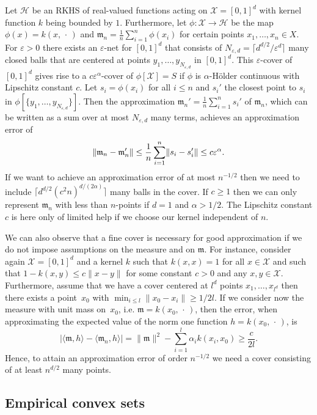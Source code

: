 \documentclass[AHL,Unicode,longabstracts,published]{cedram}
\theoremstyle{remark}
\newcommand{\X}{\mathcal{X}}
\newcommand{\cH}{\mathcal{H}}
\newcommand{\mean}{\mathfrak{m}}
\let\originalleft\left
\let\originalright\right
\renewcommand{\left}{\mathopen{}\mathclose\bgroup\originalleft}
\renewcommand{\right}{\aftergroup\egroup\originalright}
\begin{document}
Let $\cH$ be an RKHS of real-valued functions acting on $\X= [0,1]^d$ with kernel function $k$ being bounded by $1$. Furthermore, let $\phi:\X \rightarrow \cH$ be the map $\phi(x) = k(x,\,\cdot\,)$ and $\mean_n = \frac{1}{n} \sum_{i=1}^n \phi(x_i)$ for certain points $x_1,\dots, x_n \in X$. For $\varepsilon >0$ there exists an $\varepsilon$-net for $[0,1]^d$ that consists of $N_{\varepsilon,d} = \lceil d^{d/2}/\varepsilon^d\rceil$ many closed balls that are centered at points $y_1,\dots, y_{N_{\varepsilon,d}}$ in $[0,1]^d$. This $\varepsilon$-cover of $[0,1]^d$ gives rise to a $c \varepsilon^\alpha$-cover of $\phi[\X] = S$ if $\phi$ is $\alpha$-H\"older continuous with Lipschitz constant $c$. Let $s_i = \phi(x_i)$ for all $i\leq n$ and $s_i'$ the closest point to $s_i$ in $\phi[\{y_1,\dots,y_{N_{\varepsilon,d}}\}]$. Then the approximation $\mean_n' = \frac{1}{n} \sum_{i=1}^n s_i'$ of $\mean_n$, which can be written as a sum over at most $N_{\varepsilon,d}$ many terms, achieves an approximation error of
\[
\left\|\mean_n - \mean_n'\right\| \leq \frac{1}{n} \sum_{i=1}^n \left\|s_i - s_i'\right\| \leq c \varepsilon^\alpha.
\]
If we want to achieve an approximation error of at most $n^{-1/2}$ then we need to include $\lceil d^{d/2} (c^2n)^{d/(2\alpha)} \rceil$ many balls in the cover. If $c\geq 1$ then we can only represent $\mean_n$ with less than $n$-points if $d=1$ and $\alpha > 1/2$. The Lipschitz constant $c$ is here only of limited help if we choose our kernel independent of $n$.


We can also observe that a fine cover is necessary for good approximation if we do not impose assumptions on the measure and on $\mean$. For instance, consider again $\X=[0,1]^d$ and a kernel $k$ such that $k(x,x) = 1$ for all $x\in \X$ and such that $1 - k(x,y) \leq c\|x-y\|$ for some constant $c>0$ and any $x,y \in \X$. Furthermore, assume that we have a cover centered at $l^d$ points $x_1,\dots,x_{l^d}$ then there exists a point~$x_0$ with $\min_{i\leq l} \|x_0 - x_i\| \geq 1/2l$. If we consider now the measure with unit mass on~$x_0$, i.e. $\mean = k(x_0,\,\cdot\,)$, then the error, when approximating the expected value of the norm one function $h = k(x_0,\,\cdot\,)$, is
\[
|\langle \mean, h \rangle - \langle \mean_n, h\rangle| = \|\mean\|^2 -
\sum_{i=1}^l \alpha_i k(x_i,x_0) \geq \frac{c}{2l}.
\]
Hence, to attain an approximation error of order $n^{-1/2}$ we need a cover consisting of at least $n^{d/2}$ many points.



\subsection{Empirical convex sets} \label{sec:emp_convex_sets}
\end{document}
